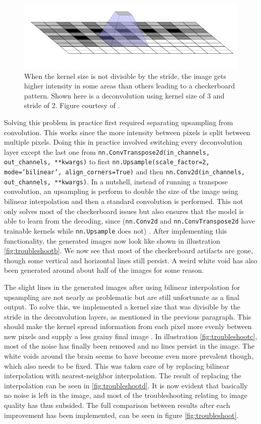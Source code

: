 \documentclass[12pt, fleqn, titlepage]{article}
\begin{document}
\begin{figure}[H]
	\centering
	\includegraphics[width=0.7\linewidth]{imgs/deconvolution_mismatch}
	\caption{When the kernel size is not divisible by the stride, the image gets higher intensity in some areas than others leading to a checkerboard pattern. Shown here is a deconvolution using kernel size of 3 and stride of 2. Figure courtesy of \cite{checkerboard}.}
	\label{fig:deconvolutionmismatch}
\end{figure}
Solving this problem in practice first required separating upsampling from convolution. This works since the more intensity between pixels is split between multiple pixels. Doing this in practice involved switching every deconvolution layer except the last one from \texttt{nn.ConvTranspose2d(in\_channels, out\_channels, **kwargs)} to first \texttt{nn.Upsample(scale\_factor=2, mode='bilinear', align\_corners=True)} and then \texttt{nn.Conv2d(in\_channels, out\_channels, **kwargs)}. In a nutshell, instead of running a transpose convolution, an upsampling is perform to double the size of the image using bilinear interpolation and then a standard convolution is performed. This not only solves most of the checkerboard issues but also ensures that the model is able to learn from the decoding, since (\texttt{nn.Conv2d} and \texttt{nn.ConvTranspose2d} have trainable kernels while \texttt{nn.Upsample} does not) \cite{learnableKernel}. After implementing this functionality, the generated images now look like shown in illustration \ref{fig:troubleshootb}. We now see that most of the checkerboard artifacts are gone, though some vertical and horizontal lines still persist. A weird white void has also been generated around about half of the images for some reason.

The slight lines in the generated images after using bilinear interpolation for upsampling are not nearly as problematic but are still unfortunate as a final output. To solve this, we implemented a kernel size that was divisible by the stride in the deconvolution layers, as mentioned in the previous paragraph. This should make the kernel spread information from each pixel more evenly between new pixels and supply a less grainy final image \cite{checkerboard}. In illustration \ref{fig:troubleshootc}, most of the noise has finally been removed and no lines persist in the image. The white voids around the brain seems to have become even more prevalent though, which also needs to be fixed. This was taken care of by replacing bilinear interpolation with nearest-neighbor interpolation. The result of replacing the interpolation can be seen in \ref{fig:troubleshootd}. It is now evident that basically no noise is left in the image, and most of the troubleshooting relating to image quality has thus subsided. The full comparison between results after each improvement has been implemented, can be seen in figure \ref{fig:troubleshoot}.
\end{document}

